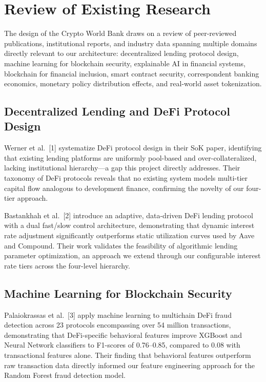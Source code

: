 \documentclass[12pt,a4paper]{report}
\begin{document}
\section{Review of Existing Research}

The design of the Crypto World Bank draws on a review of peer-reviewed publications, institutional reports, and industry data spanning multiple domains directly relevant to our architecture: decentralized lending protocol design, machine learning for blockchain security, explainable AI in financial systems, blockchain for financial inclusion, smart contract security, correspondent banking economics, monetary policy distribution effects, and real-world asset tokenization.

\subsection{Decentralized Lending and DeFi Protocol Design}

Werner et al.~[1] systematize DeFi protocol design in their SoK paper, identifying that existing lending platforms are uniformly pool-based and over-collateralized, lacking institutional hierarchy---a gap this project directly addresses. Their taxonomy of DeFi protocols reveals that no existing system models multi-tier capital flow analogous to development finance, confirming the novelty of our four-tier approach.

Bastankhah et al.~[2] introduce an adaptive, data-driven DeFi lending protocol with a dual fast/slow control architecture, demonstrating that dynamic interest rate adjustment significantly outperforms static utilization curves used by Aave and Compound. Their work validates the feasibility of algorithmic lending parameter optimization, an approach we extend through our configurable interest rate tiers across the four-level hierarchy.

\subsection{Machine Learning for Blockchain Security}

Palaiokrassas et al.~[3] apply machine learning to multichain DeFi fraud detection across 23 protocols encompassing over 54 million transactions, demonstrating that DeFi-specific behavioral features improve XGBoost and Neural Network classifiers to F1-scores of 0.76--0.85, compared to 0.08 with transactional features alone. Their finding that behavioral features outperform raw transaction data directly informed our feature engineering approach for the Random Forest fraud detection model.
\end{document}
